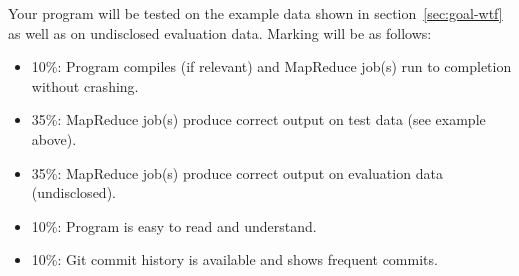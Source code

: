 \documentclass[11pt]{article}
\begin{document}
Your program will be tested on the example data shown in
section~\ref{sec:goal-wtf} as well as on undisclosed evaluation
data. Marking will be as follows:
\begin{itemize}
\item 10\%: Program compiles (if relevant) and MapReduce job(s) run to completion without crashing.
\item 35\%: MapReduce job(s) produce correct output on test data (see example above).
\item 35\%: MapReduce job(s) produce correct output on evaluation data (undisclosed).
\item 10\%: Program is easy to read and understand.
\item 10\%: Git commit history is available and shows frequent commits.
\end{itemize}
\end{document}
